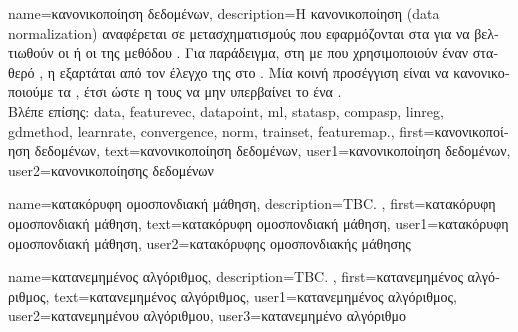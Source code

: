 {name={\foreignlanguage{greek}{κανονικοποίηση δεδομένων}},
	description={\foreignlanguage{greek}{Η κανονικοποίηση}  
		(data normalization) \foreignlanguage{greek}{αναφέρεται σε μετασχηματισμούς που εφαρμόζονται στα}  
		 \foreignlanguage{greek}{για να βελτιωθούν οι}  \foreignlanguage{greek}{ή οι} 
		 \foreignlanguage{greek}{της μεθόδου} . \foreignlanguage{greek}{Για παράδειγμα, στη} 
		 \foreignlanguage{greek}{με}  \foreignlanguage{greek}{που χρησιμοποιούν έναν σταθερό}
		, \foreignlanguage{greek}{η}  \foreignlanguage{greek}{εξαρτάται από τον έλεγχο της} 
		  \foreignlanguage{greek}{στο} . \foreignlanguage{greek}{Μία κοινή 
		προσέγγιση είναι να κανονικοποιούμε τα} , \foreignlanguage{greek}{έτσι ώστε η} 
		 \foreignlanguage{greek}{τους να μην υπερβαίνει το ένα} \cite[\foreignlanguage{greek}{Κεφ.}\ 5]{MLBasics}.
		\\
		\foreignlanguage{greek}{Βλέπε επίσης:} \gls{data}, \gls{featurevec}, \gls{datapoint}, \gls{ml}, \gls{statasp}, \gls{compasp}, 
		\gls{linreg}, \gls{gdmethod}, \gls{learnrate}, \gls{convergence}, \gls{norm}, \gls{trainset}, \gls{featuremap}.},
	first={\foreignlanguage{greek}{κανονικοποίηση δεδομένων}},
	text={\foreignlanguage{greek}{κανονικοποίηση δεδομένων}},
	user1={\foreignlanguage{greek}{κανονικοποίηση δεδομένων}}, %
  	user2={\foreignlanguage{greek}{κανονικοποίησης δεδομένων}} %
}

{name={\foreignlanguage{greek}{κατακόρυφη ομοσπονδιακή μάθηση}},
	description={TBC. },
	first={\foreignlanguage{greek}{κατακόρυφη ομοσπονδιακή μάθηση}},
	text={\foreignlanguage{greek}{κατακόρυφη ομοσπονδιακή μάθηση}},
	user1={\foreignlanguage{greek}{κατακόρυφη ομοσπονδιακή μάθηση}}, %
	user2={\foreignlanguage{greek}{κατακόρυφης ομοσπονδιακής μάθησης}} %
}%

{name={\foreignlanguage{greek}{κατανεμημένος αλγόριθμος}},
	description={TBC. },
	first={\foreignlanguage{greek}{κατανεμημένος αλγόριθμος}}, 
	text={\foreignlanguage{greek}{κατανεμημένος αλγόριθμος}},
	user1={\foreignlanguage{greek}{κατανεμημένος αλγόριθμος}}, %
	user2={\foreignlanguage{greek}{κατανεμημένου αλγόριθμου}}, %
	user3={\foreignlanguage{greek}{κατανεμημένο αλγόριθμο}} %
}

